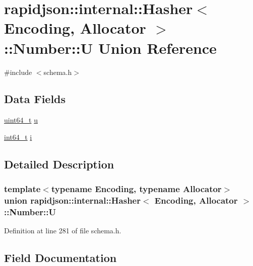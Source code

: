 \hypertarget{unionrapidjson_1_1internal_1_1_hasher_1_1_number_1_1_u}{}\section{rapidjson\+::internal\+::Hasher$<$ Encoding, Allocator $>$\+::Number\+::U Union Reference}
\label{unionrapidjson_1_1internal_1_1_hasher_1_1_number_1_1_u}


{\ttfamily \#include $<$schema.\+h$>$}

\subsection*{Data Fields}
\begin{DoxyCompactItemize}
\item 
\mbox{\hyperlink{stdint_8h_aec6fcb673ff035718c238c8c9d544c47}{uint64\+\_\+t}} \mbox{\hyperlink{unionrapidjson_1_1internal_1_1_hasher_1_1_number_1_1_u_a6e2323cf5b8d8c269c7124e65326867e}{u}}
\item 
\mbox{\hyperlink{stdint_8h_a414156feea104f8f75b4ed9e3121b2f6}{int64\+\_\+t}} \mbox{\hyperlink{unionrapidjson_1_1internal_1_1_hasher_1_1_number_1_1_u_a9e72242f195c1d4ce6a5ff43272ed70e}{i}}
\end{DoxyCompactItemize}


\subsection{Detailed Description}
\subsubsection*{template$<$typename Encoding, typename Allocator$>$\newline
union rapidjson\+::internal\+::\+Hasher$<$ Encoding, Allocator $>$\+::\+Number\+::U}



Definition at line 281 of file schema.\+h.



\subsection{Field Documentation}
\mbox{\label{unionrapidjson_1_1internal_1_1_hasher_1_1_number_1_1_u_a9e72242f195c1d4ce6a5ff43272ed70e}} 
